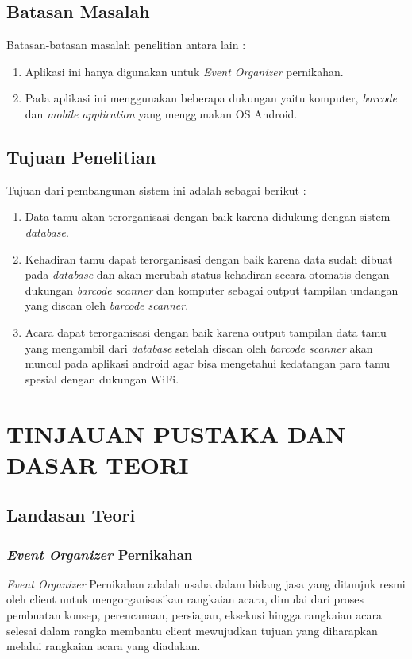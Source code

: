 \documentclass{jtetiproposalskripsi}
\begin{document}
\section{Batasan Masalah}
Batasan-batasan masalah penelitian antara lain :
\begin{enumerate}[1.]
\itemsep0em
\item Aplikasi ini hanya digunakan untuk \emph{Event Organizer} pernikahan.
\item Pada aplikasi ini menggunakan beberapa dukungan yaitu komputer, \emph{barcode} dan \emph{mobile application} yang menggunakan OS Android.
\end{enumerate}

\section{Tujuan Penelitian}
Tujuan dari pembangunan sistem ini adalah sebagai berikut : 
\begin{enumerate}[1.]
\itemsep0em
\item Data tamu akan terorganisasi dengan baik karena didukung dengan sistem \emph{database}.
\item Kehadiran tamu dapat terorganisasi dengan baik karena data sudah dibuat pada \emph{database} dan akan merubah status kehadiran secara otomatis dengan dukungan \emph{barcode scanner} dan komputer sebagai output tampilan undangan yang discan oleh \emph{barcode scanner}.
\item Acara dapat terorganisasi dengan baik karena output tampilan data tamu yang mengambil dari \emph{database} setelah discan oleh \emph{barcode scanner} akan muncul pada aplikasi android agar bisa mengetahui kedatangan para tamu spesial dengan dukungan WiFi.
\end{enumerate}

\chapter{TINJAUAN PUSTAKA DAN DASAR TEORI}                

\section{Landasan Teori}
\subsection{\emph{Event Organizer} Pernikahan}
\emph{Event Organizer} Pernikahan adalah usaha dalam bidang jasa yang ditunjuk resmi oleh client untuk mengorganisasikan rangkaian acara, dimulai dari proses pembuatan konsep, perencanaan, persiapan, eksekusi hingga rangkaian acara selesai dalam rangka membantu client mewujudkan tujuan yang diharapkan melalui rangkaian acara yang diadakan.
\end{document}
